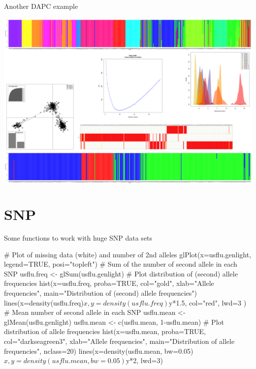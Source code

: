 \documentclass[compress, ucs, xelatex, 11pt, xcolor=svgnames,
  hyperref={
    bookmarks=true,
    unicode=true,
    colorlinks=true,
    pdftitle={Molecular data in R},
    plainpages=false,
    pdfauthor={Vojtech Zeisek},
    pdfsubject={Course about phylogeny and evolution in R},
    pdfcreator={XeLaTeX},
    pdfkeywords={R, evolution, phylogeny, molecular data},
    linkcolor=Tomato,
    anchorcolor=SaddleBrown,
    citecolor=Goldenrod,
    filecolor=DarkMagenta,
    menucolor=Sienna,
    urlcolor=DarkTurquoise,
    pdftex},
  url={hyphens, lowtilde} %
  ]{beamer}
\begin{document}
\begin{frame}{Another DAPC example}
\begin{center}
  \includegraphics[width=\textwidth-1.5cm]{dapc.png}
\end{center}
\end{frame}

\section{SNP}

\begin{frame}[fragile]{Some functions to work with huge SNP data sets}
  \begin{spluscode}
    # Plot of missing data (white) and number of 2nd alleles
    glPlot(x=usflu.genlight, legend=TRUE, posi="topleft")
    # Sum of the number of second allele in each SNP
    usflu.freq <- glSum(usflu.genlight)
    # Plot distribution of (second) allele frequencies
    hist(x=usflu.freq, proba=TRUE, col="gold", xlab="Allele
      frequencies", main="Distribution of (second) allele frequencies")
    lines(x=density(usflu.freq)$x, y=density(usflu.freq)$y*1.5,
      col="red", lwd=3 )
    # Mean number of second allele in each SNP
    usflu.mean <- glMean(usflu.genlight)
    usflu.mean <- c(usflu.mean, 1-usflu.mean)
    # Plot distribution of allele frequencies
    hist(x=usflu.mean, proba=TRUE, col="darkseagreen3",
      xlab="Allele frequencies", main="Distribution of allele
      frequencies", nclass=20)
    lines(x=density(usflu.mean, bw=0.05)$x, y=density(usflu.mean,
      bw=0.05)$y*2, lwd=3)
  \end{spluscode}
\end{frame}
\end{document}
